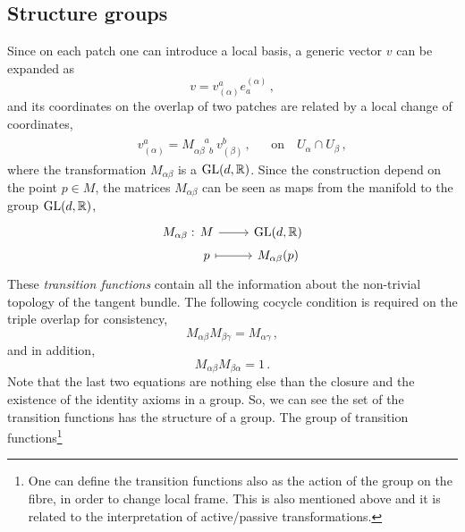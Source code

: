\documentclass[debug]{phd}
\begin{document}
				\subsection{Structure groups}
					Since on each patch one can introduce a local basis, a generic vector $v$ can be expanded as
							\begin{equation}
								v = v^a_{(\alpha)} e_a^{(\alpha)}\, ,
							\end{equation}
					and its coordinates on the overlap of two patches are related by a local change of coordinates,
							\begin{align}
								& & & & & & v^a_{(\alpha)} = M_{\alpha\beta\phantom{a} b}^{\phantom{\alpha \beta}a}\ v^b_{(\beta)}\, ,& & \mbox{on}\quad U_\alpha \cap U_\beta \, ,& & & &
							\end{align}
					where the transformation $M_{\alpha\beta}$ is a $\mathrm{GL}(d, \mathbb{R})$.
					Since the construction depend on the point $p \in M$, the matrices $M_{\alpha\beta}$ can be seen as maps from the manifold to the group $\mathrm{GL}(d, \mathbb{R})$,
							\begin{equation*}
								\begin{tikzcd}[row sep=.3mm]
									M_{\alpha \beta} :\!\!\!\!\!\!\!\!\!\!\!\!\!\!\!\!\! & M \arrow{r} & \GL(d, \RR) \\
 									& p \arrow[mapsto]{r} & M_{\alpha \beta}(p)
								\end{tikzcd}
							\end{equation*}
					These \emph{transition functions} contain all the information about the non-trivial topology of the tangent bundle.
					The following cocycle condition is required on the triple overlap for consistency,
							\begin{equation}
								M_{\alpha\beta} M_{\beta\gamma} = M_{\alpha\gamma}\, ,
							\end{equation}
					and in addition,
							\begin{equation}
								M_{\alpha\beta}M_{\beta\alpha} = 1\, .
							\end{equation}
					Note that the last two equations are nothing else than the closure and the existence of the identity axioms in a group. So, we can see the set of the transition functions has the structure of a group.
					The group of transition functions\footnote{%
						One can define the transition functions also as the action of the group on the fibre, in order to change local frame.
						This is also mentioned above and it is related to the interpretation of active/passive transformations.%
						} %
\end{document}
